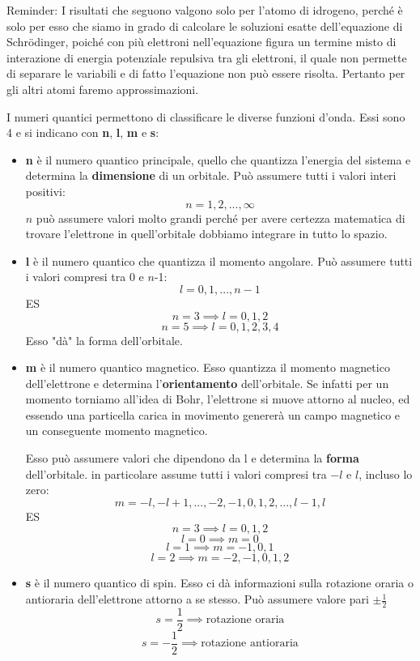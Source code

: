 Reminder: I risultati che seguono valgono solo per l'atomo di idrogeno, perché è solo per esso che siamo in grado di calcolare le soluzioni esatte dell'equazione di Schrödinger, poiché con più elettroni nell'equazione figura un termine misto di interazione di energia potenziale repulsiva tra gli elettroni, il quale non permette di separare le variabili e di fatto l'equazione non può essere risolta. Pertanto per gli altri atomi faremo approssimazioni.

I numeri quantici permettono di classificare le diverse funzioni d'onda. Essi sono 4 e si indicano con \textbf{n}, \textbf{l}, \textbf{m} e \textbf{s}:
\begin{itemize}
  \item \textbf{n} è il numero quantico principale, quello che quantizza l'energia del sistema e determina la \textbf{dimensione} di un orbitale.
  Può assumere tutti i valori interi positivi:
  $${n=1,2,...,\infty}$$
  $n$ può assumere valori molto grandi perché per avere certezza matematica di trovare l'elettrone in quell'orbitale dobbiamo integrare in tutto lo spazio.
  \item \textbf{l} è il numero quantico che quantizza il momento angolare. Può assumere tutti i valori compresi tra 0 e $n$-1:
  $$l=0,1,...,n-1$$
  ES
  $$n=3 \implies l=0,1,2$$
  $$n=5 \implies l=0,1,2,3,4$$
  Esso "dà" la forma dell'orbitale.
  \item \textbf{m} è il numero quantico magnetico. Esso quantizza il momento magnetico dell'elettrone e determina l'\textbf{orientamento} dell'orbitale. Se infatti per un momento torniamo all'idea di Bohr, l'elettrone si muove attorno al nucleo, ed essendo una particella carica in movimento genererà un campo magnetico e un conseguente momento magnetico.
  
  Esso può assumere valori che dipendono da l e determina la \textbf{forma} dell'orbitale. in particolare assume tutti i valori compresi tra $-l$ e $l$, incluso lo zero:
  $$m=-l,-l+1,...,-2,-1,0,1,2,...,l-1,l$$
  ES 
  $$n=3 \implies l=0,1,2$$
  $$l=0 \implies m=0$$
  $$l=1 \implies m=-1,0,1$$
  $$l=2 \implies m=-2,-1,0,1,2$$
  \item \textbf{s} è il numero quantico di spin. Esso ci dà informazioni sulla rotazione oraria o antioraria dell'elettrone attorno a se stesso. Può assumere valore pari $\pm\frac{1}{2}$
  $$s=\frac{1}{2}\implies \text{rotazione oraria}$$
  $$s=-\frac{1}{2}\implies \text{rotazione antioraria}$$
\end{itemize}

